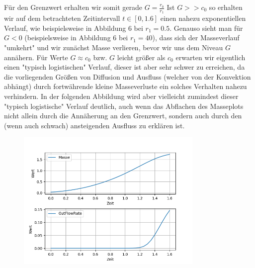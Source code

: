 Für den Grenzwert erhalten wir somit gerade $G = \frac{r_0}{r_1}$
Ist $G >> c_0 $ so erhalten wir auf dem betrachteten Zeitintervall $t \in [0,1.6]$ einen nahezu exponentiellen Verlauf, wie beispielsweise in  Abbildung 6 bei $r_1 = 0.5$. Genauso sieht man für $G<0$ (beispielsweise in Abbildung 6 bei $r_1 = 40$), dass sich der Masseverlauf "umkehrt" und wir zunächst Masse verlieren, bevor wir uns dem Niveau $G$ annähern.
Für Werte $G \approx c_0 $ bzw. $G$ leicht größer als $c_0$ erwarten wir eigentlich einen "typisch logistischen" Verlauf, dieser ist aber sehr schwer zu erreichen, da die vorliegenden Größen von Diffusion und Ausfluss (welcher von der Konvektion abhängt) durch fortwährende kleine Masseverluste ein solches Verhalten nahezu verhindern.
\newline
In der folgenden Abbildung wird aber vielleicht zumindest dieser "typisch logistische" Verlauf deutlich, auch wenn das Abflachen des Masseplots nicht allein durch die Annäherung an den Grenzwert, sondern auch durch den (wenn auch schwach) ansteigenden Ausfluss zu erklären ist. 
\begin{figure}[H]
	\centering
	\includegraphics[width=0.80\textwidth]{../Aufgabe30/Testvltgut/plot.png}
\end{figure}

